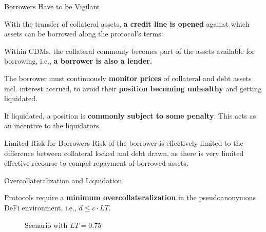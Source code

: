 \documentclass[handout]{beamer}
\begin{document}
\begin{frame}{Borrowers Have to be Vigilant}

With the transfer of collateral assets, \textbf{a credit line is opened }against which assets can be borrowed along the protocol’s terms.

\vspace{0.8 em}
Within CDMs, the collateral commonly becomes part of the assets available for borrowing, i.e., \textbf{a borrower is also a lender.}

 {
\vspace{0.8 em}
The borrower must continuously \textbf{monitor prices} of collateral and debt assets incl. interest accrued, to avoid their \textbf{position becoming unhealthy} and getting liquidated.

\vspace{0.8 em}
If liquidated, a position is \textbf{commonly subject to some penalty}. This acts as an incentive to the liquidators.
}

 {
\vspace{0.8 em}
\begin{keytakeaway}{Limited Risk for Borrowers}
	Risk of the borrower is effectively limited to the difference between collateral locked and debt drawn, as there is very limited effective recourse to compel repayment of borrowed assets. 
\end{keytakeaway}
}
	
\end{frame}


\begin{frame}{Overcollateralization and Liquidation}

Protocols require a \textbf{minimum overcollateralization} in the pseudoanonymous DeFi environment, i.e., $d \leq c \cdot LT$.
\vspace{1em}

\begin{minipage}{0.6\textwidth}
	\vspace{1.5em}
	\begin{figure}[t]
		\centering
		\begin{tikzpicture}[scale=0.5, every node/.style={scale=0.8}]
			
		\end{tikzpicture}
		\caption{Scenario with $LT = 0.75$}
	\end{figure}
\end{minipage}
\begin{minipage}{0.38\textwidth}
	
	
	\vspace{1em}
\end{minipage}
	
\end{frame}
\end{document}
